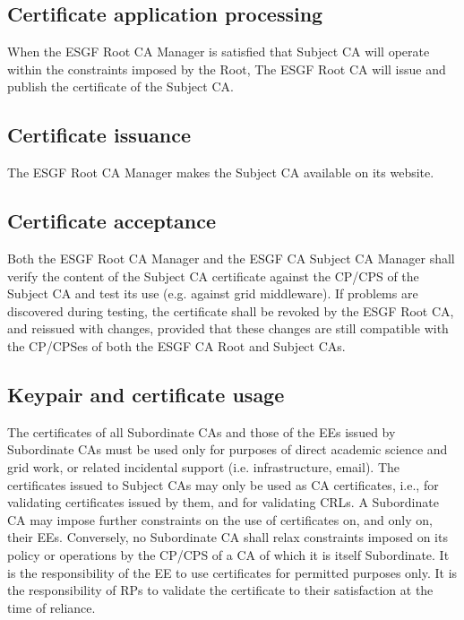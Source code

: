 \subsection{Certificate application processing}\label{certificate-application-processing}

When the ESGF Root CA Manager is satisfied that Subject CA will
operate within the constraints imposed by the Root, The ESGF Root CA
will issue and publish the certificate of the Subject CA.

\subsection{Certificate issuance}\label{certificate-issuance}

The ESGF Root CA Manager makes the Subject CA available on its
website.

\subsection{Certificate acceptance}\label{certificate-acceptance}

Both the ESGF Root CA Manager and the ESGF CA Subject CA Manager
shall verify the content of the Subject CA certificate against the
CP/CPS of the Subject CA and test its use (e.g. against grid
middleware). If problems are discovered during testing, the certificate
shall be revoked by the ESGF Root CA, and reissued with changes,
provided that these changes are still compatible with the CP/CPSes of
both the ESGF CA Root and Subject CAs.

\subsection{Keypair and certificate usage}\label{key-pair-and-certificate-usage}

The certificates of all Subordinate CAs and those of the EEs issued by
Subordinate CAs must be used only for purposes of direct academic
science and grid work, or related incidental support (i.e.
infrastructure, email). The certificates issued to Subject CAs may only
be used as CA certificates, i.e., for validating certificates issued by
them, and for validating CRLs. A Subordinate CA may impose further
constraints on the use of certificates on, and only on, their EEs.
Conversely, no Subordinate CA shall relax constraints imposed on its
policy or operations by the CP/CPS of a CA of which it is itself
Subordinate. It is the responsibility of the EE to use certificates for
permitted purposes only. It is the responsibility of RPs to validate the
certificate to their satisfaction at the time of reliance.

